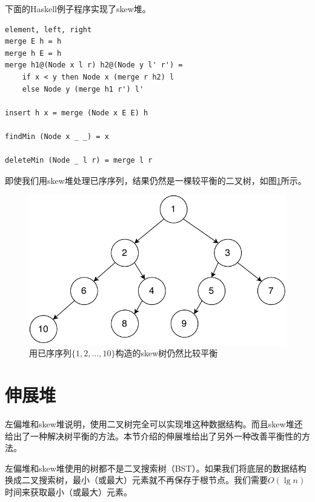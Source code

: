 \documentclass[b5paper]{ctexart}
\begin{document}
下面的Haskell例子程序实现了skew堆。

\lstset{language=Haskell}
\begin{lstlisting}element, left, right
merge E h = h
merge h E = h
merge h1@(Node x l r) h2@(Node y l' r') =
    if x < y then Node x (merge r h2) l
    else Node y (merge h1 r') l'

insert h x = merge (Node x E E) h

findMin (Node x _ _) = x

deleteMin (Node _ l r) = merge l r
\end{lstlisting}

即使我们用skew堆处理已序序列，结果仍然是一棵较平衡的二叉树，如图\ref{fig:skew-tree}所示。

\begin{figure}[htbp]
   \begin{center}
   	  \includegraphics[scale=0.5]{img/skew-tree}
    \caption{用已序序列$\{1, 2, ..., 10\}$构造的skew树仍然比较平衡}
    \label{fig:skew-tree}
   \end{center}
\end{figure}



\section{伸展堆}
\label{splayheap}

左偏堆和skew堆说明，使用二叉树完全可以实现堆这种数据结构。而且skew堆还给出了一种解决树平衡的方法。本节介绍的伸展堆给出了另外一种改善平衡性的方法。

左偏堆和skew堆使用的树都不是二叉搜索树（BST）。如果我们将底层的数据结构换成二叉搜索树，最小（或最大）元素就不再保存于根节点。我们需要$O(\lg n)$时间来获取最小（或最大）元素。
\end{document}
